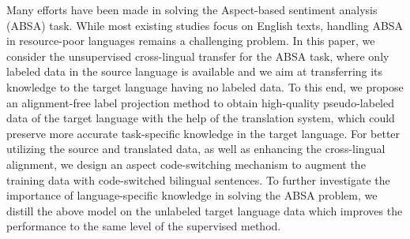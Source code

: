 Many efforts have been made in solving the Aspect-based sentiment analysis (ABSA) task. While most existing studies focus on English texts, handling ABSA in resource-poor languages remains a challenging problem. In this paper, we consider the unsupervised cross-lingual transfer for the ABSA task, where only labeled data in the source language is available and we aim at transferring its knowledge to the target language having no labeled data. To this end, we propose an alignment-free label projection method to obtain high-quality pseudo-labeled data of the target language with the help of the translation system, which could preserve more accurate task-specific knowledge in the target language. For better utilizing the source and translated data, as well as enhancing the cross-lingual alignment, we design an aspect code-switching mechanism to augment the training data with code-switched bilingual sentences. To further investigate the importance of language-specific knowledge in solving the ABSA problem, we distill the above model on the unlabeled target language data which improves the performance to the same level of the supervised method.
